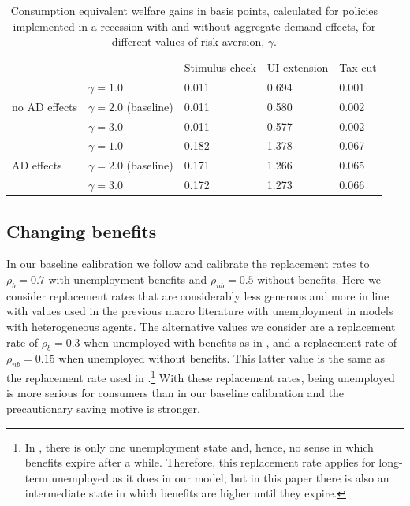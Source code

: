 \documentclass[../HAFiscal]{subfiles}
\begin{document}
\begin{table}[]
	\begin{center}
		\begin{tabular}{@{}lllll@{}}
			\toprule
			&                    & Stimulus check & UI extension & Tax cut \\ \cmidrule(l){1-5} 
			\multirow{3}{*}{no AD effects}            	& $\gamma = 1.0$ 			& 0.011          & 0.694        & 0.001   \\
			& $\gamma = 2.0$ (baseline) & 0.011          & 0.580        & 0.002   \\
			& $\gamma = 3.0$ 			& 0.011          & 0.577        & 0.002   \\ \cmidrule(l){1-5} 
			\multirow{3}{*}{AD effects}					& $\gamma = 1.0$   	 		& 0.182          & 1.378        & 0.067   \\
			& $\gamma = 2.0$ (baseline) & 0.171          & 1.266        & 0.065   \\
			& $\gamma = 3.0$    		& 0.172          & 1.273        & 0.066   \\ \cmidrule(l){1-5} 
		\end{tabular}
		\caption{Consumption equivalent welfare gains in basis points, calculated for policies implemented in a recession with and without aggregate demand effects, for different values of risk aversion, $\gamma$.}
		\label{tab:robustness_gamma_results}
	\end{center}
\end{table}



\subsection{Changing benefits} 
\label{sec:robust_benefits} 

In our baseline calibration we follow \cite{rothstein2017scraping} and calibrate the replacement rates to $\rho_b=0.7$ with unemployment benefits and $\rho_{nb}=0.5$ without benefits. Here we consider replacement rates that are considerably less generous and more in line with values used in the previous macro literature with unemployment in models with heterogeneous agents. The alternative values we consider are a replacement rate of $\rho_{b}=0.3$ when unemployed with benefits as in \cite{carroll2020modeling}, and a replacement rate of $\rho_{nb}=0.15$ when unemployed without benefits. This latter value is the same as the replacement rate used in \cite{den2010computational}.\footnote{In \cite{den2010computational}, there is only one unemployment state and, hence, no sense in which benefits expire after a while. Therefore, this replacement rate applies for long-term unemployed as it does in our model, but in this paper there is also an intermediate state in which benefits are higher until they expire.} With these replacement rates, being unemployed is more serious for consumers than in our baseline calibration and the precautionary saving motive is stronger. 
\end{document}
